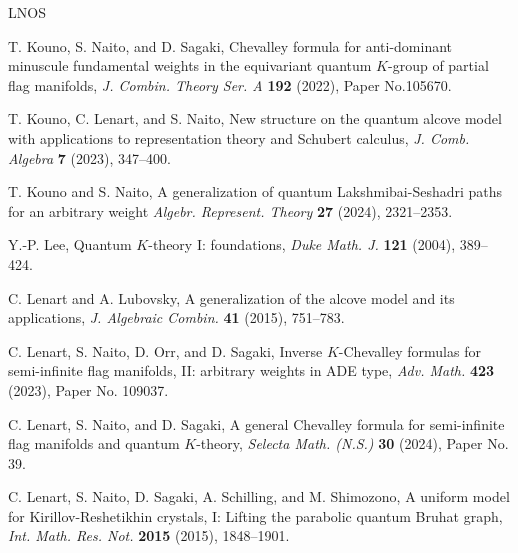 \documentclass[11pt,a4paper,reqno,dvipdfmx]{amsart}
\numberwithin{equation}{section}
\theoremstyle{plain}
\theoremstyle{definition}
\theoremstyle{remark}
\begin{document}
\begin{thebibliography}{LNOS}

T. Kouno, S. Naito, and D. Sagaki, 
Chevalley formula for anti-dominant minuscule fundamental weights 
in the equivariant quantum $K$-group of partial flag manifolds, 
{\it J. Combin. Theory Ser. A} {\bf 192} (2022), Paper No.105670. 

%

T. Kouno, C. Lenart, and S. Naito, 
New structure on the quantum alcove model with applications to representation theory and Schubert calculus, 
\textit{J. Comb. Algebra} \textbf{7} (2023), 347--400.

T. Kouno and S. Naito, 
A generalization of quantum Lakshmibai-Seshadri paths for an arbitrary weight
{\it Algebr. Represent. Theory} {\bf 27} (2024), 2321--2353. 


Y.-P. Lee, Quantum $K$-theory I: foundations, 
\textit{Duke Math. J.} \textbf{121} (2004), 389--424.

C. Lenart and A. Lubovsky, 
A generalization of the alcove model and its applications, 
\textit{J. Algebraic Combin.} \textbf{41} (2015), 751--783.

C. Lenart, S. Naito, D. Orr, and D. Sagaki, 
Inverse $K$-Chevalley formulas for semi-infinite flag manifolds, I\hspace{-1.5pt}I: 
arbitrary weights in ADE type, 
{\it Adv. Math.} {\bf 423} (2023), Paper No. 109037. 

C. Lenart, S. Naito, and D. Sagaki, 
A general Chevalley formula for semi-infinite flag manifolds and quantum $K$-theory, 
\textit{Selecta Math. (N.S.)} \textbf{30} (2024), Paper No. 39.

C. Lenart, S. Naito, D. Sagaki, A. Schilling, and M. Shimozono, 
A uniform model for Kirillov-Reshetikhin crystals, 
I: Lifting the parabolic quantum Bruhat graph, 
\textit{Int. Math. Res. Not.} {\bf 2015} (2015), 1848--1901. 


\end{thebibliography}
\end{document}
